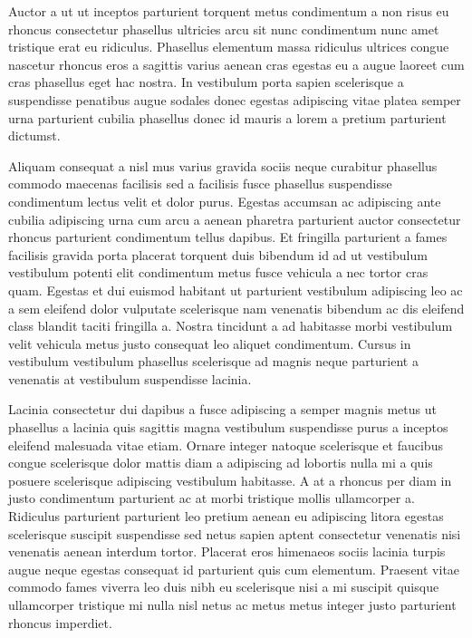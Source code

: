 \par
Auctor a ut ut inceptos parturient torquent metus condimentum a non risus eu rhoncus consectetur phasellus ultricies arcu sit nunc condimentum nunc amet tristique erat eu ridiculus. Phasellus elementum massa ridiculus ultrices congue nascetur rhoncus eros a sagittis varius aenean cras egestas eu a augue laoreet cum cras phasellus eget hac nostra. In vestibulum porta sapien scelerisque a suspendisse penatibus augue sodales donec egestas adipiscing vitae platea semper urna parturient cubilia phasellus donec id mauris a lorem a pretium parturient dictumst.
\par
Aliquam consequat a nisl mus varius gravida sociis neque curabitur phasellus commodo maecenas facilisis sed a facilisis fusce phasellus suspendisse condimentum lectus velit et dolor purus. Egestas accumsan ac adipiscing ante cubilia adipiscing urna cum arcu a aenean pharetra parturient auctor consectetur rhoncus parturient condimentum tellus dapibus. Et fringilla parturient a fames facilisis gravida porta placerat torquent duis bibendum id ad ut vestibulum vestibulum potenti elit condimentum metus fusce vehicula a nec tortor cras quam. Egestas et dui euismod habitant ut parturient vestibulum adipiscing leo ac a sem eleifend dolor vulputate scelerisque nam venenatis bibendum ac dis eleifend class blandit taciti fringilla a. Nostra tincidunt a ad habitasse morbi vestibulum velit vehicula metus justo consequat leo aliquet condimentum. Cursus in vestibulum vestibulum phasellus scelerisque ad magnis neque parturient a venenatis at vestibulum suspendisse lacinia. 
\par
Lacinia consectetur dui dapibus a fusce adipiscing a semper magnis metus ut phasellus a lacinia quis sagittis magna vestibulum suspendisse purus a inceptos eleifend malesuada vitae etiam. Ornare integer natoque scelerisque et faucibus congue scelerisque dolor mattis diam a adipiscing ad lobortis nulla mi a quis posuere scelerisque adipiscing vestibulum habitasse. A at a rhoncus per diam in justo condimentum parturient ac at morbi tristique mollis ullamcorper a. Ridiculus parturient parturient leo pretium aenean eu adipiscing litora egestas scelerisque suscipit suspendisse sed netus sapien aptent consectetur venenatis nisi venenatis aenean interdum tortor. Placerat eros himenaeos sociis lacinia turpis augue neque egestas consequat id parturient quis cum elementum. Praesent vitae commodo fames viverra leo duis nibh eu scelerisque nisi a mi suscipit quisque ullamcorper tristique mi nulla nisl netus ac metus metus integer justo parturient rhoncus imperdiet. 
